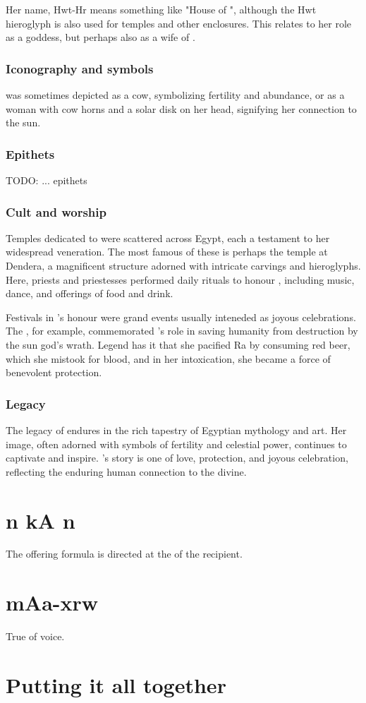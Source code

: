 Her name, Hwt-Hr means something like "House of ", although the Hwt hieroglyph is also used for temples and other enclosures. This relates to her role as a  goddess, but perhaps also as a wife of .

\subsubsection*{Iconography and symbols}

 was sometimes depicted as a cow, symbolizing fertility and abundance, or as a woman with cow horns and a solar disk on her head, signifying her connection to the sun.

\subsubsection*{Epithets}

TODO: ... epithets

\subsubsection*{Cult and worship}

Temples dedicated to  were scattered across Egypt, each a testament to her widespread veneration. The most famous of these is perhaps the temple at Dendera, a magnificent structure adorned with intricate carvings and hieroglyphs. Here, priests and priestesses performed daily rituals to honour , including music, dance, and offerings of food and drink.

Festivals in 's honour were grand events usually inteneded as joyous celebrations. The , for example, commemorated 's role in saving humanity from destruction by the sun god's wrath. Legend has it that she pacified Ra by consuming red beer, which she mistook for blood, and in her intoxication, she became a force of benevolent protection.

\subsubsection*{Legacy}

The legacy of  endures in the rich tapestry of Egyptian mythology and art. Her image, often adorned with symbols of fertility and celestial power, continues to captivate and inspire. 's story is one of love, protection, and joyous celebration, reflecting the enduring human connection to the divine.

\section*{n kA n}

The offering formula is directed at the  of the recipient.

\section*{mAa-xrw}

True of voice.

\section*{Putting it all together}